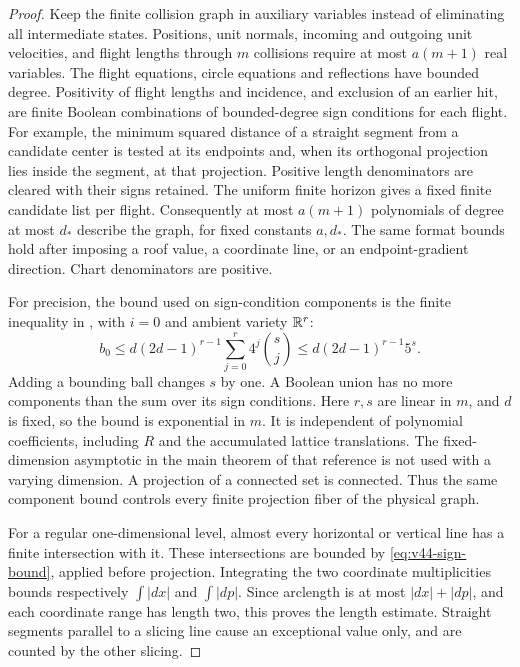 \begin{proof}
Keep the finite collision graph in auxiliary variables instead of
eliminating all intermediate states. Positions, unit normals, incoming
and outgoing unit velocities, and flight lengths through $m$ collisions
require at most $a(m+1)$ real variables. The flight equations, circle
equations and reflections have bounded degree. Positivity of flight
lengths and incidence, and exclusion of an earlier hit, are finite
Boolean combinations of bounded-degree sign conditions for each flight.
For example, the minimum squared distance of a straight segment from a
candidate center is tested at its endpoints and, when its orthogonal
projection lies inside the segment, at that projection. Positive
length denominators are cleared with their signs retained. The uniform
finite horizon gives a fixed finite candidate list per flight.
Consequently at most $a(m+1)$ polynomials of degree at most $d_*$
describe the graph, for fixed constants $a,d_*$. The same format
bounds hold after imposing a roof value, a coordinate line, or an
endpoint-gradient direction. Chart denominators are positive.

For precision, the bound used on sign-condition components is the
finite inequality in \cite[Section 3.2, equation (3.3)]{BPR}, with
$i=0$ and ambient variety $\mathbb R^r$:
\begin{equation}\label{eq:v44-sign-bound}
 b_0\le d(2d-1)^{r-1}\sum_{j=0}^r4^j\binom{s}{j}
       \le d(2d-1)^{r-1}5^s.
\end{equation}
Adding a bounding ball changes $s$ by one. A Boolean union has no
more components than the sum over its sign conditions. Here $r,s$
are linear in $m$, and $d$ is fixed, so the bound is exponential in
$m$. It is independent of polynomial coefficients, including $R$ and
the accumulated lattice translations. The fixed-dimension asymptotic
in the main theorem of that reference is not used with a varying dimension.
A projection of a connected set is connected. Thus the same component
bound controls every finite projection fiber of the physical graph.

For a regular one-dimensional level, almost every horizontal or
vertical line has a finite intersection with it. These intersections
are bounded by \eqref{eq:v44-sign-bound}, applied before projection.
Integrating the two coordinate multiplicities bounds respectively
$\int|dx|$ and $\int|dp|$. Since arclength is at most
$|dx|+|dp|$, and each coordinate range has length two, this proves
the length estimate. Straight segments parallel to a slicing line
cause an exceptional value only, and are counted by the other slicing.


\end{proof}
